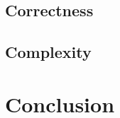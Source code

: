 \documentclass[a4paper,USenglish]{lipics-v2021} %
\begin{document}
\subsection{Correctness}

\subsection{Complexity}

\section{Conclusion}


\end{document}
